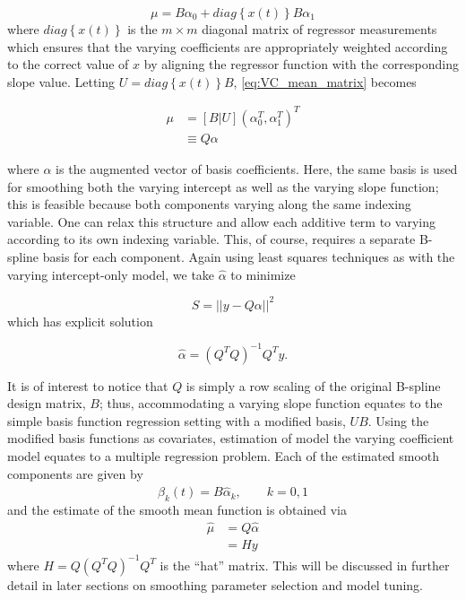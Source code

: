 \documentclass[12pt]{article}
\theoremstyle{definition}
\begin{document}
\begin{equation} \label{eq:VC_mean_matrix}
\mu = B\alpha_0 + diag\left\{x\left(t\right) \right\}B\alpha_1
\end{equation} 
\noindent
where $diag\left\{x\left(t\right) \right\}$ is the $m \times m$ diagonal matrix of regressor measurements which ensures that the varying coefficients are appropriately weighted according to the correct value of $x$ by aligning the regressor function with the corresponding slope value. Letting $U = diag\left\{x\left(t\right) \right\}B$, \ref{eq:VC_mean_matrix} becomes

\begin{align}
\mu &= \left[ B | U \right] \left(\alpha_0^T,\alpha_1^T\right)^T \\
&\equiv Q\alpha
\end{align} 

where $\alpha$ is the augmented vector of basis coefficients. Here, the same basis is used for smoothing both the varying intercept as well as the varying slope function; this is feasible because both components varying along the same indexing variable. One can relax this structure and allow each additive term to varying according to its own indexing variable. This, of course, requires a separate B-spline basis for each component. Again using least squares techniques as with the varying intercept-only model, we take $\hat{\alpha}$ to minimize

\begin{equation} \label{eq:S_varying_intercept_slope_model}
S = \vert \vert y-Q\alpha \vert \vert ^2
\end{equation}
which has explicit solution

\[
\hat{\alpha} =\left(Q^T Q\right)^{-1} Q^Ty.
\]

It is of interest to notice that $Q$ is simply a row scaling of the original B-spline design matrix, $B$; thus, accommodating a varying slope function equates to the simple basis function regression setting with a modified basis, $UB$. Using the modified basis functions as covariates, estimation of model the varying coefficient model equates to a multiple regression problem. Each of the estimated smooth components are given by 
\[
\hat{\beta}_k\left(t \right)= B\hat{\alpha}_k, \qquad k=0,1
\]
\noindent
and the estimate of the smooth mean function is obtained via 
\begin{align*}
\hat{\mu} &= Q\hat{\alpha}\\
&= Hy
\end{align*}
where $H = Q\left(Q^T Q\right)^{-1} Q^T$ is the ``hat'' matrix. This will be discussed in further detail in later sections on smoothing parameter selection and model tuning.
\end{document}
